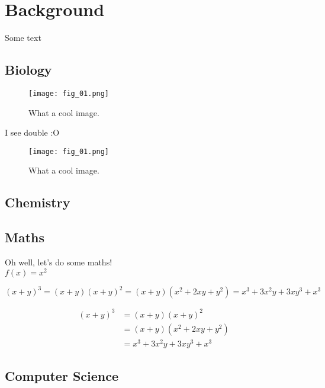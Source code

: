 \chapter{Background}
Some text

\section{Biology}

\begin{figure}[h]
    \centering
    \texttt{[image: fig\_01.png]}
    \caption{What a cool image.}
    \label{fig:f01}
\end{figure}


I see double :O

\begin{figure}[h]
	\centering
	\texttt{[image: fig\_01.png]}
	\caption{What a cool image.}
	\label{fig:f01}
\end{figure}


\newpage
\section{Chemistry}

\newpage
\section{Maths}

Oh well, let's do some maths! \\

$f(x)=x^2$

\begin{equation}
		(x+y)^3 = (x+y)(x+y)^2
       		    =(x+y)(x^2+2xy+y^2)
                =x^3+3x^2y+3xy^3+x^3
\end{equation}

\begin{equation}
	\begin{split}
		(x+y)^3&=(x+y)(x+y)^2 \\
       		   &=(x+y)(x^2+2xy+y^2) \\
               &=x^3+3x^2y+3xy^3+x^3
	\end{split}
    \label{useful_name}
\end{equation}

\newpage
\section{Computer Science}

